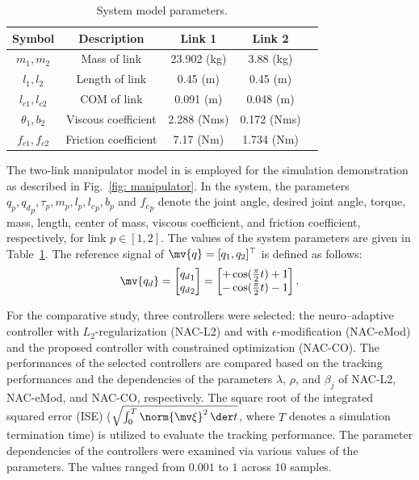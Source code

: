 \documentclass[letterpaper, 10 pt, conference]{ieeeconf}  %
\newcommand*{\q}{\mv{q}}
\newcommand*{\qd}{\mv{q_d}}
\begin{document}
\begin{table}[!t]
    \renewcommand{\arraystretch}{1.3}
    \caption{System model parameters.}
    \centering
    \begin{tabular}{|c||c|c|c|c|}
    \hline
    Symbol & \textbf{Description} & \textbf{Link 1} & \textbf{Link 2} \\
    \hline 
    $m_1, m_2$ & Mass of link    & 23.902 (kg) & 3.88 (kg) \\
    \hline
    $l_1, l_2$  & Length of link   & 0.45 (m) & 0.45 (m) \\
    \hline
    $l_{c1}, l_{c2}$ & COM of link  & 0.091 (m) & 0.048 (m) \\
    \hline
    $\theta_1, b_2$   & Viscous coefficient  &  2.288 (Nms) & 0.172 (Nms) \\
    \hline
    $f_{c1}, f_{c2}$  & Friction coefficient &  7.17 (Nm) & 1.734 (Nm) \\
    \hline
    \end{tabular}
    \label{table: system parameters}
\end{table}

The two-link manipulator model in \cite{Markus:2013aa} is employed for the simulation demonstration as described in Fig.~\ref{fig: manipulator}.
In the system, the parameters $q_p,{q_d}_p,\tau_p,m_p,l_p,{l_c}_p,b_p$ and ${f_c}_p$ denote the joint angle, desired joint angle, torque, mass, length, center of mass, viscous coefficient, and friction coefficient, respectively, for link $p\in[1,2]$.
The values of the system parameters are given in Table~\ref{table: system parameters}.
The reference signal of $\q=[q_1,q_2]^\top $ is defined as follows:
\begin{equation}
    \qd
    =
    \begin{bmatrix}
        {q_d}_1\\
        {q_d}_2
    \end{bmatrix}
    = 
    \begin{bmatrix}
        +\cos(
            \tfrac{\pi}{2}t
        ) + 1 \\
        -\cos(
            \tfrac{\pi}{2}t
        ) - 1 
    \end{bmatrix}
    .
\end{equation}

For the comparative study, three controllers were selected: the neuro–adaptive controller with $L_2$-regularization (NAC-L2) and with $\epsilon$-modification (NAC-eMod) and the proposed controller with constrained optimization (NAC-CO).
The performances of the selected controllers are compared based on the tracking performances and the dependencies of the parameters $\lambda$, $\rho$, and $\beta_j$ of NAC-L2, NAC-eMod, and NAC-CO, respectively.
The square root of the integrated squared error (ISE) (\ie $\sqrt{\int_0^T \norm{\mv \xi}^2\,\der t}$, where $T$ denotes a simulation termination time) is utilized to evaluate the tracking performance.
The parameter dependencies of the controllers were examined via various values of the parameters. 
The values ranged from $0.001$ to $1$ across $10$ samples.
\end{document}
